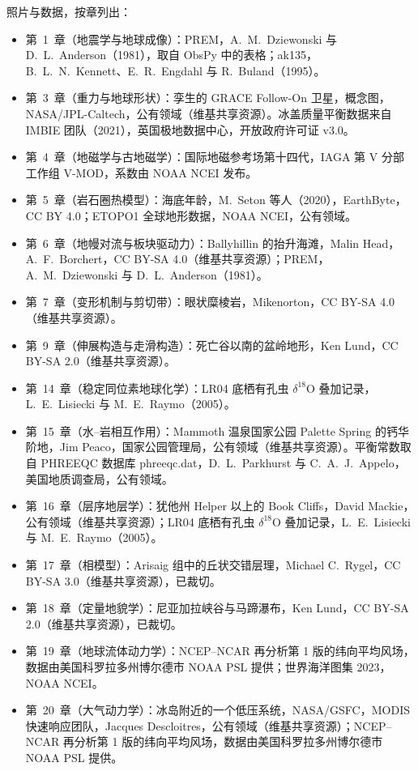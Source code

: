 \bigskip
\noindent 照片与数据，按章列出：
\begin{itemize}\small
  \item 第~1~章（地震学与地球成像）：PREM，A.~M.~Dziewonski 与 D.~L.~Anderson（1981），取自 ObsPy 中的表格；ak135，B.~L.~N.~Kennett、E.~R.~Engdahl 与 R.~Buland（1995）。
  \item 第~3~章（重力与地球形状）：孪生的 GRACE Follow-On 卫星，概念图，NASA/JPL-Caltech，公有领域（维基共享资源）。冰盖质量平衡数据来自 IMBIE 团队（2021），英国极地数据中心，开放政府许可证 v3.0。
  \item 第~4~章（地磁学与古地磁学）：国际地磁参考场第十四代，IAGA 第 V 分部工作组 V-MOD，系数由 NOAA NCEI 发布。
  \item 第~5~章（岩石圈热模型）：海底年龄，M.~Seton 等人（2020），EarthByte，CC BY 4.0；ETOPO1 全球地形数据，NOAA NCEI，公有领域。
  \item 第~6~章（地幔对流与板块驱动力）：Ballyhillin 的抬升海滩，Malin Head，A.~F.~Borchert，CC BY-SA 4.0（维基共享资源）；PREM，A.~M.~Dziewonski 与 D.~L.~Anderson（1981）。
  \item 第~7~章（变形机制与剪切带）：眼状糜棱岩，Mikenorton，CC BY-SA 4.0（维基共享资源）。
  \item 第~9~章（伸展构造与走滑构造）：死亡谷以南的盆岭地形，Ken Lund，CC BY-SA 2.0（维基共享资源）。
  \item 第~14~章（稳定同位素地球化学）：LR04 底栖有孔虫 $\delta^{18}$O 叠加记录，L.~E.~Lisiecki 与 M.~E.~Raymo（2005）。
  \item 第~15~章（水–岩相互作用）：Mammoth 温泉国家公园 Palette Spring 的钙华阶地，Jim Peaco，国家公园管理局，公有领域（维基共享资源）。平衡常数取自 PHREEQC 数据库 phreeqc.dat，D.~L.~Parkhurst 与 C.~A.~J.~Appelo，美国地质调查局，公有领域。
  \item 第~16~章（层序地层学）：犹他州 Helper 以上的 Book Cliffs，David Mackie，公有领域（维基共享资源）；LR04 底栖有孔虫 $\delta^{18}$O 叠加记录，L.~E.~Lisiecki 与 M.~E.~Raymo（2005）。
  \item 第~17~章（相模型）：Arisaig 组中的丘状交错层理，Michael C.~Rygel，CC BY-SA 3.0（维基共享资源），已裁切。
  \item 第~18~章（定量地貌学）：尼亚加拉峡谷与马蹄瀑布，Ken Lund，CC BY-SA 2.0（维基共享资源），已裁切。
  \item 第~19~章（地球流体动力学）：NCEP--NCAR 再分析第 1 版的纬向平均风场，数据由美国科罗拉多州博尔德市 NOAA PSL 提供；世界海洋图集 2023，NOAA NCEI。
  \item 第~20~章（大气动力学）：冰岛附近的一个低压系统，NASA/GSFC，MODIS 快速响应团队，Jacques Descloitres，公有领域（维基共享资源）；NCEP--NCAR 再分析第 1 版的纬向平均风场，数据由美国科罗拉多州博尔德市 NOAA PSL 提供。

\end{itemize}
